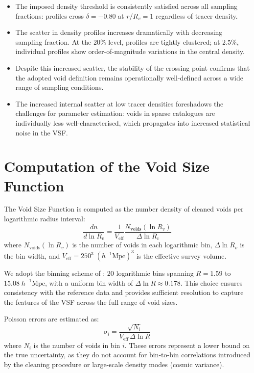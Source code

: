 \documentclass[12pt]{report}
\begin{document}
\begin{itemize}
    \item The imposed density threshold is consistently satisfied across all sampling fractions: profiles cross $\delta = -0.80$ at $r/R_v = 1$ regardless of tracer density.
    \item The scatter in density profiles increases dramatically with decreasing sampling fraction. At the 20\% level, profiles are tightly clustered; at 2.5\%, individual profiles show order-of-magnitude variations in the central density.
    \item Despite this increased scatter, the stability of the crossing point confirms that the adopted void definition remains operationally well-defined across a wide range of sampling conditions.
    \item The increased internal scatter at low tracer densities foreshadows the challenges for parameter estimation: voids in sparse catalogues are individually less well-characterised, which propagates into increased statistical noise in the VSF.
\end{itemize}


\section{Computation of the Void Size Function}
\label{sec:vsf_computation}

The Void Size Function is computed as the number density of cleaned voids per logarithmic radius interval:
\begin{equation}
    \frac{dn}{d\ln R_v} = \frac{1}{V_\mathrm{eff}} \frac{N_\mathrm{voids}(\ln R_v)}{\Delta \ln R_v}
    \label{eq:vsf_computation}
\end{equation}
where $N_\mathrm{voids}(\ln R_v)$ is the number of voids in each logarithmic bin, $\Delta \ln R_v$ is the bin width, and $V_\mathrm{eff} = 250^3\;(h^{-1}\mathrm{Mpc})^3$ is the effective survey volume.

We adopt the binning scheme of \citet{Sartori2025}: 20 logarithmic bins spanning $R = 1.59$ to $15.08\;h^{-1}\mathrm{Mpc}$, with a uniform bin width of $\Delta\ln R \approx 0.178$. This choice ensures consistency with the reference data and provides sufficient resolution to capture the features of the VSF across the full range of void sizes.

Poisson errors are estimated as:
\begin{equation}
    \sigma_i = \frac{\sqrt{N_i}}{V_\mathrm{eff}\,\Delta\ln R}
    \label{eq:poisson_error}
\end{equation}
where $N_i$ is the number of voids in bin $i$. These errors represent a lower bound on the true uncertainty, as they do not account for bin-to-bin correlations introduced by the cleaning procedure or large-scale density modes (cosmic variance).
\end{document}

